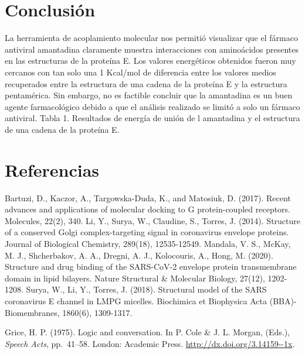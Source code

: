 \documentclass[12pt]{article}
\begin{document}
\section{Conclusión}

La herramienta de acoplamiento molecular nos permitió visualizar que el fármaco antiviral amantadina claramente muestra interacciones con aminoácidos presentes en las estructuras de la proteína E. Los valores energéticos obtenidos fueron muy cercanos con tan solo una 1 Kcal/mol de diferencia entre los valores medios recuperados entre la estructura de una cadena de la proteína E y la estructura pentamérica. Sin embargo, no es factible concluir que la amantadina es un buen agente farmacológico debido a que el análisis realizado se limitó a solo un fármaco antiviral.
Tabla 1. Resultados de energía de unión de l amantadina y el estructura de una cadena de la proteína E.








%
%
\section*{Referencias}

\begin{hangparas}{1em}{1}

 Bartuzi, D., Kaczor, A., Targowska-Duda, K., and Matosiuk, D. (2017). Recent advances and applications of molecular docking to G protein-coupled receptors. Molecules, 22(2), 340.
Li, Y., Surya, W., Claudine, S., Torres, J. (2014). Structure of a conserved Golgi complex-targeting signal in coronavirus envelope proteins. Journal of Biological Chemistry, 289(18), 12535-12549.
Mandala, V. S., McKay, M. J., Shcherbakov, A. A., Dregni, A. J., Kolocouris, A., Hong, M. (2020). Structure and drug binding of the SARS-CoV-2 envelope protein transmembrane domain in lipid bilayers. Nature Structural & Molecular Biology, 27(12), 1202-1208.
Surya, W., Li, Y.,  Torres, J. (2018). Structural model of the SARS coronavirus E channel in LMPG micelles. Biochimica et Biophysica Acta (BBA)-Biomembranes, 1860(6), 1309-1317.


\vfill %
\break

Grice, H. P. (1975).  Logic and conversation. In P. Cole \& J.
L. Morgan, (Eds.), \textit{Speech Acts}, pp.\ 41--58. London: Academic
Press. \url{http://dx.doi.org/3.14159--1x}.
\end{hangparas}
\end{document}
